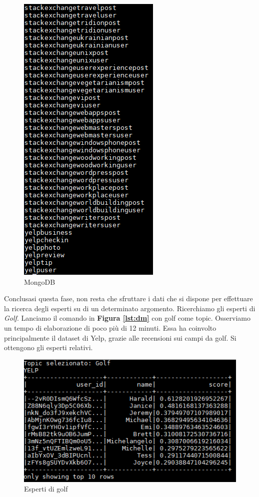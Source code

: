 \begin{figure}[H]
	\includegraphics[scale=0.9]{image/mongo2.PNG}
	\caption{MongoDB}
	\label{fig:mongo}
\end{figure}

Conclusasi questa fase, non resta che sfruttare i dati che si dispone per effettuare la ricerca degli esperti su di un determinato argomento. Ricerchiamo gli esperti di \emph{Golf}. Lanciamo il comando in \textbf{Figura \ref{lst:dm}} con golf come topic. Osserviamo un tempo di elaborazione di poco più di 12 minuti. Essa ha coinvolto principalmente il dataset di Yelp, grazie alle recensioni sui campi da golf. Si ottengono gli esperti relativi.

\begin{figure}[H]
	\centering
	\includegraphics{image/golf.PNG}
	\caption{Esperti di golf}
	\label{fig:golf}
\end{figure}

